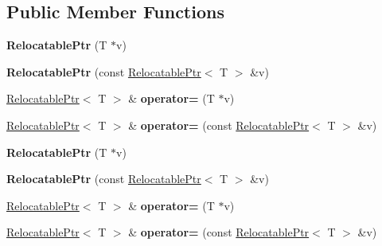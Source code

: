 \subsection*{Public Member Functions}
\begin{DoxyCompactItemize}
\item 
\hypertarget{classjs_1_1_relocatable_ptr_a769a936915c9026cc465e2c5d38fa7eb}{{\bfseries Relocatable\-Ptr} (T $\ast$v)}\label{classjs_1_1_relocatable_ptr_a769a936915c9026cc465e2c5d38fa7eb}

\item 
\hypertarget{classjs_1_1_relocatable_ptr_ace537cd753cc3ecbb57858f20a326869}{{\bfseries Relocatable\-Ptr} (const \hyperlink{classjs_1_1_relocatable_ptr}{Relocatable\-Ptr}$<$ T $>$ \&v)}\label{classjs_1_1_relocatable_ptr_ace537cd753cc3ecbb57858f20a326869}

\item 
\hypertarget{classjs_1_1_relocatable_ptr_addce9e3e8aa4bbd4991b6b4c8b646c53}{\hyperlink{classjs_1_1_relocatable_ptr}{Relocatable\-Ptr}$<$ T $>$ \& {\bfseries operator=} (T $\ast$v)}\label{classjs_1_1_relocatable_ptr_addce9e3e8aa4bbd4991b6b4c8b646c53}

\item 
\hypertarget{classjs_1_1_relocatable_ptr_a62cfdf0d69ba25ab4a7ff49255a51c48}{\hyperlink{classjs_1_1_relocatable_ptr}{Relocatable\-Ptr}$<$ T $>$ \& {\bfseries operator=} (const \hyperlink{classjs_1_1_relocatable_ptr}{Relocatable\-Ptr}$<$ T $>$ \&v)}\label{classjs_1_1_relocatable_ptr_a62cfdf0d69ba25ab4a7ff49255a51c48}

\item 
\hypertarget{classjs_1_1_relocatable_ptr_a769a936915c9026cc465e2c5d38fa7eb}{{\bfseries Relocatable\-Ptr} (T $\ast$v)}\label{classjs_1_1_relocatable_ptr_a769a936915c9026cc465e2c5d38fa7eb}

\item 
\hypertarget{classjs_1_1_relocatable_ptr_ace537cd753cc3ecbb57858f20a326869}{{\bfseries Relocatable\-Ptr} (const \hyperlink{classjs_1_1_relocatable_ptr}{Relocatable\-Ptr}$<$ T $>$ \&v)}\label{classjs_1_1_relocatable_ptr_ace537cd753cc3ecbb57858f20a326869}

\item 
\hypertarget{classjs_1_1_relocatable_ptr_addce9e3e8aa4bbd4991b6b4c8b646c53}{\hyperlink{classjs_1_1_relocatable_ptr}{Relocatable\-Ptr}$<$ T $>$ \& {\bfseries operator=} (T $\ast$v)}\label{classjs_1_1_relocatable_ptr_addce9e3e8aa4bbd4991b6b4c8b646c53}

\item 
\hypertarget{classjs_1_1_relocatable_ptr_a62cfdf0d69ba25ab4a7ff49255a51c48}{\hyperlink{classjs_1_1_relocatable_ptr}{Relocatable\-Ptr}$<$ T $>$ \& {\bfseries operator=} (const \hyperlink{classjs_1_1_relocatable_ptr}{Relocatable\-Ptr}$<$ T $>$ \&v)}\label{classjs_1_1_relocatable_ptr_a62cfdf0d69ba25ab4a7ff49255a51c48}

\end{DoxyCompactItemize}
